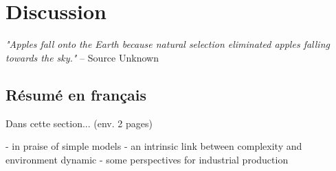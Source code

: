 \chapter{Discussion}

\textit{"Apples fall onto the Earth because natural selection eliminated apples falling towards the sky."} -- Source Unknown

\section*{Résumé en français}

Dans cette section... (env. 2 pages)

- in praise of simple models
- an intrinsic link between complexity and environment dynamic
- some perspectives for industrial production


